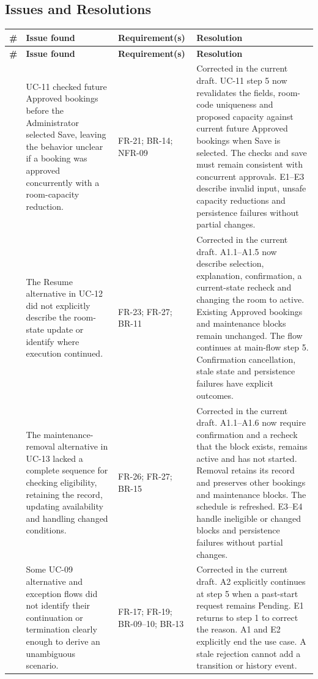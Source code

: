 \subsection{Issues and Resolutions}
\begingroup
\small
{}
\setlength{\tabcolsep}{4pt}
\renewcommand{\arraystretch}{1.15}
\begin{longtable}{|>{\centering\arraybackslash}p{}|>{\raggedright\arraybackslash}p{}|>{\raggedright\arraybackslash}p{}|>{\raggedright\arraybackslash}p{}|}
\hline
\textbf{\#} & \textbf{Issue found} & \textbf{Requirement(s)} & \textbf{Resolution} \\ \hline
\endfirsthead
\hline
\textbf{\#} & \textbf{Issue found} & \textbf{Requirement(s)} & \textbf{Resolution} \\ \hline
\endhead
\hline
\endfoot
\hline
\endlastfoot
1 & UC-11 checked future Approved bookings before the Administrator selected Save, leaving the behavior unclear if a booking was approved concurrently with a room-capacity reduction. & FR-21; BR-14; NFR-09 & Corrected in the current draft. UC-11 step 5 now revalidates the fields, room-code uniqueness and proposed capacity against current future Approved bookings when Save is selected. The checks and save must remain consistent with concurrent approvals. E1--E3 describe invalid input, unsafe capacity reductions and persistence failures without partial changes. \\ \hline
2 & The Resume alternative in UC-12 did not explicitly describe the room-state update or identify where execution continued. & FR-23; FR-27; BR-11 & Corrected in the current draft. A1.1--A1.5 now describe selection, explanation, confirmation, a current-state recheck and changing the room to active. Existing Approved bookings and maintenance blocks remain unchanged. The flow continues at main-flow step 5. Confirmation cancellation, stale state and persistence failures have explicit outcomes. \\ \hline
3 & The maintenance-removal alternative in UC-13 lacked a complete sequence for checking eligibility, retaining the record, updating availability and handling changed conditions. & FR-26; FR-27; BR-15 & Corrected in the current draft. A1.1--A1.6 now require confirmation and a recheck that the block exists, remains active and has not started. Removal retains its record and preserves other bookings and maintenance blocks. The schedule is refreshed. E3--E4 handle ineligible or changed blocks and persistence failures without partial changes. \\ \hline
4 & Some UC-09 alternative and exception flows did not identify their continuation or termination clearly enough to derive an unambiguous scenario. & FR-17; FR-19; BR-09--10; BR-13 & Corrected in the current draft. A2 explicitly continues at step 5 when a past-start request remains Pending. E1 returns to step 1 to correct the reason. A1 and E2 explicitly end the use case. A stale rejection cannot add a transition or history event. \\ \hline
\end{longtable}
\endgroup

